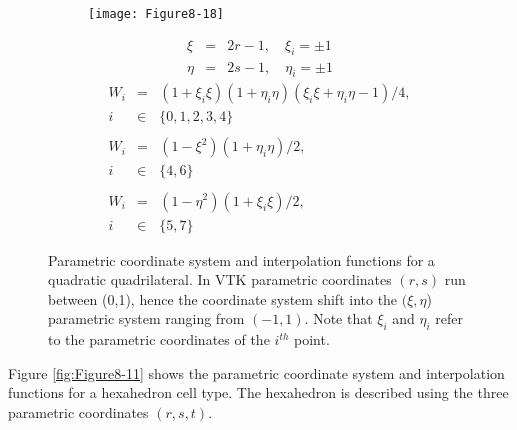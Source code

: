 \begin{description}[leftmargin=0cm,labelindent=0cm]
    \begin{figure}[!htb]
        \centering
        \begin{subfigure}{0.48\linewidth}
            \centering
            \texttt{[image: Figure8-18]}
            \caption*{}
        \end{subfigure}
        \hfill
        \begin{subfigure}{0.48\linewidth}
            \centering
            \begin{equation*}
            \begin{array}{lll}
            \xi &=& 2 r  - 1, \quad \xi_i = \pm 1 \\
            \eta &=& 2 s - 1, \quad \eta_i = \pm 1
            \end{array}
            \end{equation*}
            \begin{equation*}
            \begin{array}{lll}
            W_i &=& (1 + \xi_i \xi)(1 + \eta_i \eta)(\xi_i \xi + \eta_i \eta - 1)/4, \\
            i &\in& \lbrace 0, 1, 2, 3, 4 \rbrace \\ \\
            W_i &=& (1 - \xi^2)(1 + \eta_i \eta)/2,\\
            i &\in& \lbrace 4, 6 \rbrace  \\ \\
            W_i &=& (1 - \eta^2)(1 + \xi_i \xi)/2, \\
            i &\in& \lbrace 5, 7 \rbrace
            \end{array}
            \end{equation*}
        \end{subfigure}%
        \caption{Parametric coordinate system and interpolation functions for a quadratic quadrilateral. In VTK parametric coordinates $(r,s)$ run between (0,1), hence the coordinate system shift into the $(\xi, \eta$) parametric system ranging from $(-1,1)$. Note that $\xi_i$ and $\eta_i$ refer to the parametric coordinates of the $i^{th}$ point.}
        \label{fig:Figure8-18}
    \end{figure}

    \item[Hexahedron.\index{interpolation function!hexahedron}] Figure \ref{fig:Figure8-11} shows the parametric coordinate system and interpolation functions for a hexahedron cell type. The hexahedron is described using the three parametric coordinates $(r,s,t)$.


\end{description}
